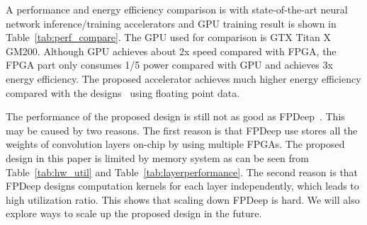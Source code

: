 A performance and energy efficiency comparison is with state-of-the-art neural network inference/training accelerators and GPU training result is shown in Table~\ref{tab:perf_compare}. The GPU used for comparison is GTX Titan X GM200. Although GPU achieves about 2x speed compared with FPGA, the FPGA part only consumes 1/5 power compared with GPU and achieves 3x energy efficiency. The proposed accelerator achieves much higher energy efficiency compared with the designs~\cite{liu2017fpga, zhao2016f} using floating point data.

The performance of the proposed design is still not as good as FPDeep~\cite{geng2018fpdeep}. This may be caused by two reasons. The first reason is that FPDeep use stores all the weights of convolution layers on-chip by using multiple FPGAs. The proposed design in this paper is limited by memory system as can be seen from Table~\ref{tab:hw_util} and Table~\ref{tab:layerperformance}. The second reason is that FPDeep designs computation kernels for each layer independently, which leads to high utilization ratio. This shows that scaling down FPDeep is hard. We will also explore ways to scale up the proposed design in the future.









